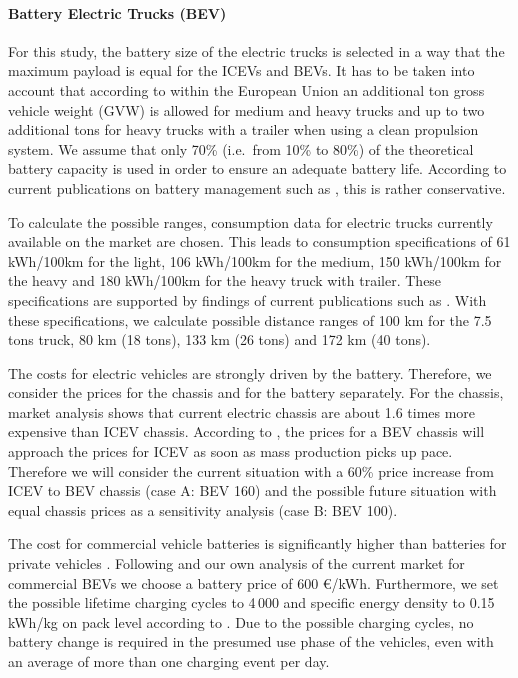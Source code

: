 \paragraph*{Battery Electric Trucks (BEV)}
For this study, the battery size of the electric trucks is selected in a way that the maximum payload is equal for the ICEVs and BEVs. 
It has to be taken into account that according to \cite{THEEUROPEANPARLIAMENTANDTHECOUNCILOFTHEEUROPEANUNION.29.04.2015} within the European Union an additional ton gross vehicle weight (GVW) is allowed for medium and heavy trucks and up to two additional tons for heavy trucks with a trailer when using a clean propulsion system.
We assume that only 70\% (i.e.\ from 10\% to 80\%) of the theoretical battery capacity is used in order to ensure an adequate battery life. 
According to current publications on battery management such as \cite{Rehman.18.09.201622.09.2016}, this is rather conservative.

To calculate the possible ranges, consumption data for electric trucks currently available on the market are chosen. 
This leads to consumption specifications of 61 kWh/100km for the light, 106 kWh/100km for the medium, 150 kWh/100km for the heavy and 180 kWh/100km for the heavy truck with trailer. 
These specifications are supported by findings of current publications such as \cite{Gao.2017}.
With these specifications, we calculate possible distance ranges of 100 km for the 7.5 tons truck, 80 km (18 tons), 133 km (26 tons) and 172 km (40 tons).

The costs for electric vehicles are strongly driven by the battery. Therefore, we consider the prices for the chassis and for the battery separately.
For the chassis, market analysis shows that current electric chassis are about 1.6 times more expensive than ICEV chassis. According to \cite{Fuel.2017}, the prices for a BEV chassis will approach the prices for ICEV as soon as mass production picks up pace. 
Therefore we will consider the current situation with a 60\% price increase from ICEV to BEV chassis (case A: BEV 160) and the possible future situation with equal chassis prices as a sensitivity analysis (case B: BEV 100).

The cost for commercial vehicle batteries is significantly higher than batteries for private vehicles \cite{IKTfurElektromobilitat.2015}. 
Following \cite{IKTfurElektromobilitat.2015} and our own analysis of the current market for commercial BEVs we choose a battery price of 600 \euro/kWh. 
Furthermore, we set the possible lifetime charging cycles to 4\,000 and specific energy density to 0.15 kWh/kg on pack level according to \cite{Gohlich.2019}. 
Due to the possible charging cycles, no battery change is required in the presumed use phase of the vehicles, even with an average of more than one charging event per day.

